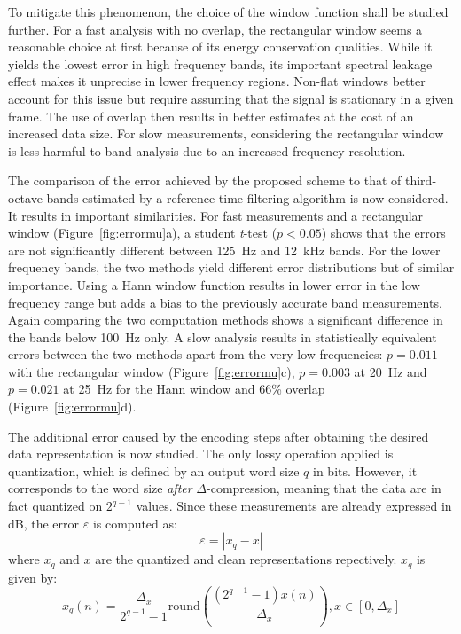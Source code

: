 \documentclass[sensors,article,accept,moreauthors,pdftex,10pt,a4paper]{mdpi}
\begin{document}
To mitigate this phenomenon, the choice of the window function shall be studied further. For a fast analysis with no overlap, the rectangular window seems a reasonable choice at first because of its energy conservation qualities. While it yields the lowest error in high frequency bands, its important spectral leakage effect makes it unprecise in lower frequency regions. Non-flat windows better account for this issue but require assuming that the signal is stationary in a given frame. The use of overlap then results in better estimates at the cost of an increased data size. For slow measurements, considering the rectangular window is less harmful to band analysis due to an increased frequency resolution.

The comparison of the error achieved by the proposed scheme to that of third-octave bands estimated by a reference time-filtering algorithm is now considered. It results in important similarities. For fast measurements and a rectangular window (Figure~\ref{fig:errormu}a), a student \emph{t}-test ($p<0.05$) shows that the errors are not significantly different between 125~Hz and 12~kHz bands. For the lower frequency bands, the two methods yield different error distributions but of similar importance. Using a Hann window function results in lower error in the low frequency range but adds a bias to the previously accurate band measurements. Again comparing the two computation methods shows a significant difference in the bands below 100~Hz only. A slow analysis results in statistically equivalent errors between the two methods apart from the very low frequencies: $p = 0.011$ with the rectangular window (Figure~\ref{fig:errormu}c), $p = 0.003$ at 20~Hz and $p = 0.021$ at 25~Hz for the Hann window and 66\% overlap (Figure~\ref{fig:errormu}d).

The additional error caused by the encoding steps after obtaining the desired data representation is now studied. The only lossy operation applied is quantization, which is defined by an output word size $q$ in bits. However, it corresponds to the word size \textit{after} $\Delta$-compression, meaning that the data {are} in fact quantized on $2^{q-1}$ values. Since these measurements are already expressed in dB, the error $\varepsilon$ is computed as:
\begin{equation*}
	\varepsilon = |x_q-x|
\end{equation*}
where $x_q$ and $x$ are the quantized and clean representations repectively. $x_q$ is given by:
\begin{equation*}
x_q(n) = \frac{\Delta_x}{2^{q-1}-1}\textrm{round}\left(\frac{(2^{q-1}-1)x(n)}{\Delta_x}\right), x\in \left[0, \Delta_x\right]
\end{equation*}
\end{document}
